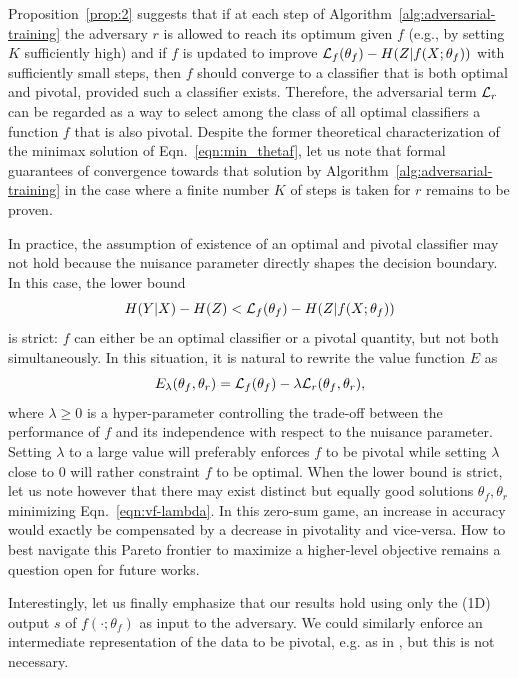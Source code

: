 \documentclass{article}
\theoremstyle{plain}
\begin{document}
Proposition~\ref{prop:2} suggests that if at each step of
Algorithm~\ref{alg:adversarial-training} the adversary $r$ is allowed to reach
its optimum given $f$ (e.g., by setting $K$ sufficiently high) and if $f$ is
updated to improve ${\cal L}_f(\theta_f) -  H({Z|f(X;\theta_f)})$ with
sufficiently small steps, then $f$ should converge to a classifier that is both
optimal and pivotal, provided such a classifier exists. Therefore, the adversarial term ${\cal L}_r$
can be regarded as a way to select among
the class of all optimal classifiers a function $f$ that is also pivotal.
Despite the former theoretical characterization of the minimax solution
of Eqn.~\ref{eqn:min_thetaf}, let us note that formal guarantees of
convergence towards that solution by
Algorithm~\ref{alg:adversarial-training} in the case where a finite number $K$
of steps is taken for $r$ remains to be proven.

In practice, the assumption of existence of an optimal and pivotal classifier may
not hold because the nuisance parameter directly shapes the decision boundary.
In this case, the lower bound
\begin{equation}\label{eqn:lower-bound-strict}
    H({Y|X}) - H(Z) < {\cal L}_f(\theta_f) - H({Z|f(X;\theta_f)})
\end{equation} is strict: $f$ can either be an optimal classifier or a
pivotal quantity, but not both simultaneously. In this situation, it is natural
to rewrite the value function $E$  as
\begin{equation}\label{eqn:vf-lambda}
    E_\lambda(\theta_f, \theta_r) = {\cal L}_f(\theta_f) - \lambda {\cal L}_r(\theta_f, \theta_r),
\end{equation}
where $\lambda \geq 0$ is a hyper-parameter controlling the trade-off between
the performance of $f$ and its independence with respect to the nuisance
parameter. Setting $\lambda$ to a large value will preferably enforces $f$ to be
pivotal while setting $\lambda$ close to $0$ will rather constraint $f$ to be
optimal. When the lower bound is strict, let us note however that there may
exist distinct but equally good solutions $\theta_f,\theta_r$ minimizing
Eqn.~\ref{eqn:vf-lambda}. In this zero-sum game, an increase in accuracy would
exactly be compensated by a decrease in pivotality and vice-versa. How to best
navigate this Pareto frontier to maximize a higher-level objective remains a
question open for future works.

Interestingly, let us finally emphasize that our results hold using only the
(1D) output $s$ of $f(\cdot;\theta_f)$ as
input to the adversary. We could similarly enforce an intermediate
representation of the data to be pivotal, e.g. as in
\citep{ganin2014unsupervised}, but this is not necessary.
\end{document}
